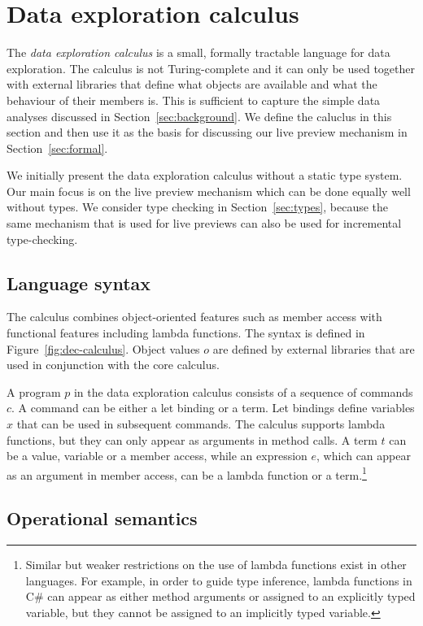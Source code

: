 \documentclass[acmsmall,anonymous,fleqn]{acmart}\settopmatter{printfolios=false,printccs=false,printacmref=false}
\theoremstyle{plain}
\theoremstyle{definition}
\begin{document}
\newpage

\section{Data exploration calculus}
\label{sec:calculus}

The \emph{data exploration calculus} is a small, formally tractable language for data exploration.
The calculus is not Turing-complete and it can only be used together with external libraries that
define what objects are available and what the behaviour of their members is. This is
sufficient to capture the simple data analyses discussed in Section~\ref{sec:background}. We
define the caluclus in this section and then use it as the basis for discussing our live preview
mechanism in Section~\ref{sec:formal}.

We initially present the data exploration calculus without a static type system. Our main focus
is on the live preview mechanism which can be done equally well without types. We consider
type checking in Section~\ref{sec:types}, because the same mechanism that is used for live previews
can also be used for incremental type-checking.

\subsection{Language syntax}
The calculus combines object-oriented features such as member access with functional features
including lambda functions. The syntax is defined in Figure~\ref{fig:dec-calculus}. Object values
$o$ are defined by external libraries that are used in conjunction with the core calculus.

A program $p$ in the data exploration calculus consists of a sequence of commands $c$. A command
can be either a let binding or a term. Let bindings define variables $x$ that can be used in
subsequent commands. The calculus supports lambda functions, but they
can only appear as arguments in method calls. A term $t$ can be a value, variable or a
member access, while an expression $e$, which can appear as an argument in member access,
can be a lambda function or a term.\footnote{Similar but weaker restrictions on the use of lambda
functions exist in other languages. For example, in order to guide type inference, lambda functions
in C\# can appear as either method arguments or assigned to an explicitly typed variable, but they
cannot be assigned to an implicitly typed variable.}

\subsection{Operational semantics}
\label{sec:calculus-semantics}
\end{document}
